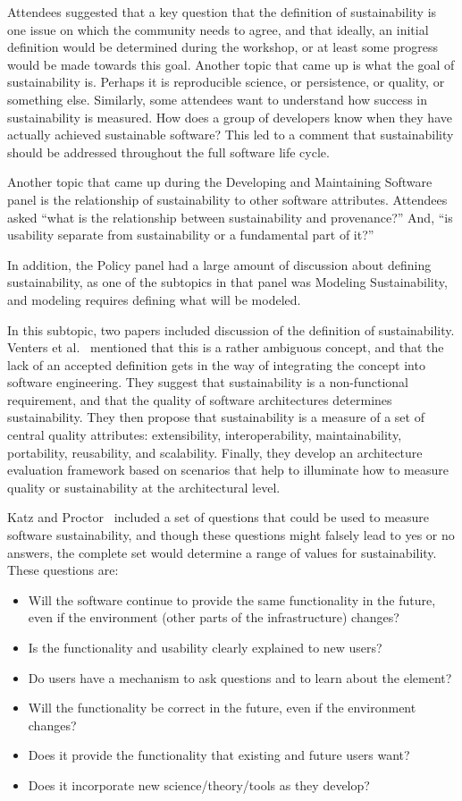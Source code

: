 \documentclass[11pt, oneside]{amsart}
\begin{document}
Attendees suggested that a key question that the definition of sustainability
is one issue on which the community needs to agree, and that ideally, an
initial definition would be determined during the workshop, or at least some
progress would be made towards this goal.  Another topic that came up is what
the goal of sustainability is.  Perhaps it is reproducible science, or
persistence, or quality, or something else.  Similarly, some attendees want to
understand how success in sustainability is measured.  How does a group of
developers know when they have actually achieved sustainable software? This led
to a comment that sustainability should be addressed throughout the full
software life cycle.

Another topic that came up during the Developing and Maintaining Software panel
is the relationship of sustainability to other software attributes.  Attendees
asked ``what is the relationship between sustainability and provenance?'' And,
``is usability separate from sustainability or a fundamental part of it?''

In addition, the Policy panel had a large amount of discussion about defining
sustainability, as one of the subtopics in that panel was Modeling
Sustainability, and modeling requires defining what will be modeled.

In this subtopic, two papers included discussion of the definition of
sustainability.  Venters et al.~\cite{Venters_WSSSPE} mentioned that this is a
rather ambiguous concept, and that the lack of an accepted definition gets in
the way of integrating the concept into software engineering. They suggest that
sustainability is a non-functional requirement, and that the quality of
software architectures determines sustainability.  They then propose that
sustainability is a measure of a set of central quality attributes:
extensibility, interoperability, maintainability, portability, reusability, and
scalability. Finally, they develop an architecture evaluation framework based
on scenarios that help to illuminate how to measure quality or sustainability
at the architectural level.

Katz and Proctor~\cite{Katz_WSSSPE} included a set of questions that could be
used to measure software sustainability, and though these questions might
falsely lead to yes or no answers, the complete set would determine a range of
values for sustainability. These questions are:
\begin{itemize}
\item Will the software continue to provide the same functionality in the future, 
      even if the environment (other parts of the infrastructure) changes?
\item Is the functionality and usability clearly explained to new users? 
\item Do users have a mechanism to ask questions and to learn about the element?
\item Will the functionality be correct in the future, even if the environment changes?
\item Does it provide the functionality that existing and future users want?
\item Does it incorporate new science/theory/tools as they develop?
\end{itemize}
\end{document}
